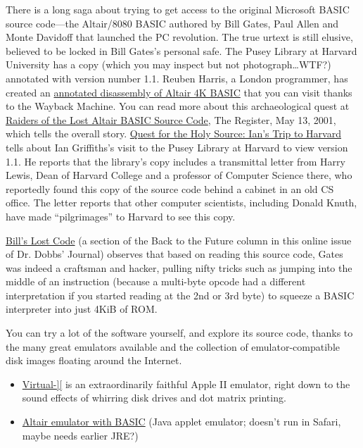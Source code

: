 \documentclass{article}
\begin{document}


There is a long saga about trying to get access to the original
Microsoft BASIC source code---the Altair/8080 BASIC authored by Bill
Gates, Paul Allen and Monte Davidoff that launched the PC revolution.
The true urtext is still elusive, believed to be locked in Bill Gates's
personal safe.
The Pusey Library at Harvard University has a copy (which you may
inspect but not photograph\ldots{}WTF?) annotated with version number
1.1.
Reuben Harris, a London programmer, has created an
\href{http://web.archive.org/web/20011211233332/www.rjh.org.uk/altair/4k/index2.html}{annotated
disassembly of Altair 4K BASIC} that you can visit thanks to the
Wayback Machine.
You can read more about this archaeological quest at
\href{http://www.theregister.co.uk/2001/05/13/raiders_of_the_lost_altair/}{Raiders
of the Lost Altair BASIC Source Code}, The Register, May 13, 2001,
which tells the overall story.
\href{http://www.interact-sw.co.uk/altair/other\%20versions/ian.htm}{Quest
for the Holy Source: Ian's Trip to Harvard} tells about Ian
Griffiths's visit to the Pusey Library at Harvard to view version
1.1.
He reports that the library's copy includes a transmittal letter from
Harry Lewis, Dean of Harvard College and a professor of Computer
Science there, who reportedly found this copy of the source code behind
a cabinet in an old CS office.
The letter reports that other computer scientists, including Donald
Knuth, have made ``pilgrimages'' to Harvard to see this copy.

\href{http://www.drdobbs.com/back-to-the-future/184404733}{Bill's
  Lost Code} (a section of the Back to the Future column in this online
issue of Dr. Dobbs' Journal) observes that based on reading this source
code, Gates was indeed a craftsman and hacker, pulling nifty tricks such
as jumping into the middle of an instruction (because a multi-byte
opcode had a different interpretation if you started reading at the 2nd
or 3rd byte) to squeeze a BASIC interpreter into just 4KiB of ROM.

You can try a lot of the software yourself, and explore
its source code, thanks to the many great emulators available and the
collection of emulator-compatible disk images floating around the Internet.

\begin{itemize}
\item \href{http://virtualii.com}{Virtual-][} is an extraordinarily
  faithful Apple II emulator, right down to the sound effects of
  whirring disk drives and dot matrix printing.

\item \href{http://web.archive.org/web/20011211231432/http://www.rjh.org.uk/altair/4k/em/altem.htm}{Altair emulator with BASIC} (Java applet emulator; doesn't run in Safari,
maybe needs earlier JRE?)



\end{itemize}



\end{document}
